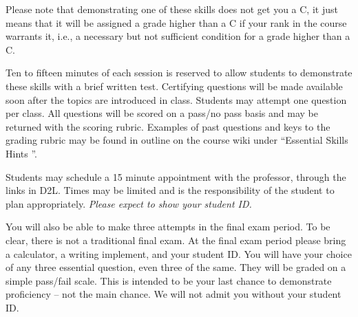 \documentclass[letterpaper,10pt]{article}
\begin{document}
 Please note that demonstrating one of these skills does not get you a
 C, it just means that it will be assigned a grade higher than a C if
 your rank in the course warrants it, i.e., a necessary but not sufficient condition for a grade higher than a C.
 
 Ten to fifteen minutes of each session is reserved to allow
 students to demonstrate these skills with a brief written test.
 Certifying questions will be made available soon after the topics are introduced in class. Students may attempt one question per class.  All questions
 will be scored on a pass/no pass basis and may be returned with the
 scoring rubric.  
 Examples of past questions and keys to the grading rubric may be found
 in outline on the course wiki under ``Essential Skills Hints ''.

 
 Students may schedule a 15 minute appointment with the professor, through the links
 in D2L.   Times may be limited
 and is the responsibility of the student to plan appropriately.
 \emph{Please expect to show your student ID.}
 
 You will also be able to make three attempts in the
 final exam period.   To be clear, there is not a traditional final exam. At the final exam period please bring a calculator, a writing implement, and
 your student ID.  You will have your choice of any three essential
 question, even three of the same.  They will be graded on a simple
 pass/fail scale.  This is intended to be your last chance to
 demonstrate proficiency -- not the main chance.  We will not admit you
 without your student ID.



\end{document}
